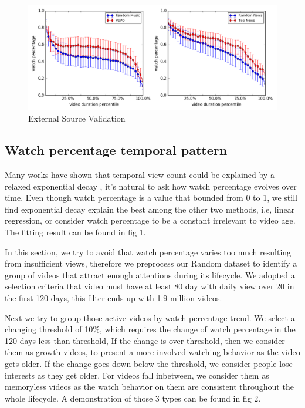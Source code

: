 \begin{figure}
    \centering
    \includegraphics[scale=0.32]{image/external_source_comp.png}
    \caption{External Source Validation}
\end{figure}

\subsection{Watch percentage temporal pattern}

Many works have shown that temporal view count could be explained by a relaxed exponential decay \cite{(R.Crane and D.Sornette, viral videos short paper)}, it's natural to ask how watch percentage evolves over time. Even though watch percentage is a value that bounded from 0 to 1, we still find exponential decay explain the best among the other two methods, i.e, linear regression, or consider watch percentage to be a constant irrelevant to video age. The fitting result can be found in fig 1.

In this section, we try to avoid that watch percentage varies too much resulting from insufficient views, therefore we preprocess our Random dataset to identify a group of videos that attract enough attentions during its lifecycle. We adopted a selection criteria that video must have at least 80 day with daily view over 20 in the first 120 days, this filter ends up with 1.9 million videos.

Next we try to group those active videos by watch percentage trend. We select a changing threshold of 10\%, which requires the change of watch percentage in the 120 days less than threshold, If the change is over threshold, then we consider them as growth videos, to present a more involved watching behavior as the video gets older. If the change goes down below the threshold, we consider people lose interests as they get older. For videos fall inbetween, we consider them as memoryless videos as the watch behavior on them are consistent throughout the whole lifecycle. A demonstration of those 3 types can be found in fig 2.

